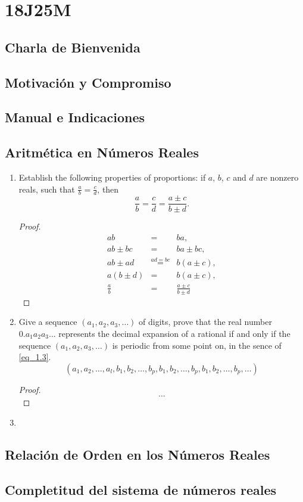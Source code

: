 \chapter{18J25M}
\section{Charla de Bienvenida}

\section{Motivaci\'{o}n y Compromiso}

\section{Manual e Indicaciones}

\section{Aritm\'{e}tica en N\'{u}meros Reales}
\begin{enumerate}
  \item Establish the following properties of proportions: if $a$, $b$, $c$ and $d$ are nonzero reals, such that $\frac{a}{b}= \frac{c}{d}$, then
  \begin{equation*}
    \frac{a}{b}= \frac{c}{d}= \frac{a\pm c}{b\pm d}.
  \end{equation*}
  \begin{proof}
    \begin{eqnarray*}
      ab&=& ba,\\
      ab\pm bc &=& ba\pm bc,\\
      ab\pm ad&\overset{ad= bc}{=}& b(a\pm c),\\
      a(b\pm d)&=& b(a\pm c),\\
      \frac{a}{b}&=& \frac{a\pm c}{b\pm d}
    \end{eqnarray*}
  \end{proof}
  
  \item Give a sequence $(a_{1}, a_{2}, a_{3}, \dots)$ of digits, prove that the real number $0.a_{1}a_{2}a_{3}\dots$ represents the decimal expansion of a rational if and only if the sequence $(a_{1}, a_{2}, a_{3}, \dots)$ is periodic from some point on, in the sence of \ref{eq_1.3}.
  \begin{equation}\label{eq_1.3}
    (a_{1}, a_{2}, \dots, a_{l}, b_{1}, b_{2}, \dots, b_{p}, b_{1}, b_{2}, \dots, b_{p}, b_{1}, b_{2}, \dots, b_{p}, \dots)
  \end{equation}
  \begin{proof}
  $$\dots$$
  \hline
  \end{proof}
  
  \item
\end{enumerate}

\section{Relaci\'{o}n de Orden en los N\'{u}meros Reales}

\section{Completitud del sistema de n\'{u}meros reales}
